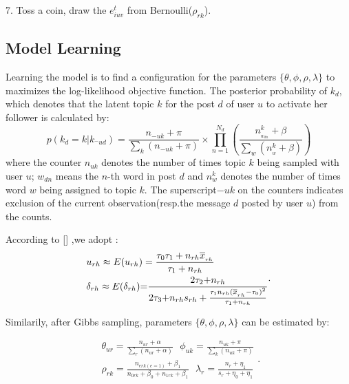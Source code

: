 \documentclass[runningheads,a4paper]{llncs}
\begin{document}
7. Toss a coin, draw the $e_{iuv}^t$ from Bernoulli(${\rho _{rk}}$).

\subsection{Model Learning}
Learning the model is to find a configuration for the parameters $\{ \theta ,\phi ,\rho ,\lambda \}$ to maximizes the log-likelihood objective function.
The posterior probability of ${k_{d}}$, which denotes that the latent topic $k$ for the post $d$ of user $u$ to activate her follower is calculated by:
\begin{equation}\label{14}
  p(k_d=k|{k_{{}^ - ud}}) = \frac{{{n_{ - uk}} + \pi }}{{\sum\limits_k {({n_{ - uk}} + \pi )} }} \times \prod\limits_{n = 1}^{{N_d}} {(\frac{{n_{_{{w_{dn}}}}^k + \beta }}{{\sum\limits_w {(n_{_w}^k + \beta )} }})}
\end{equation}
where the counter $n_{uk}$ denotes the number of times topic $k$ being sampled with user $u$; $w_{dn}$ means the $n$-th word in post $d$ and $n_w^k$ denotes the number of times word $w$ being assigned to topic $k$. The superscript$- uk$ on the counters indicates exclusion of the current observation(resp.the message $d$ posted by user $u$) from the counts.

According to [\cite{bernardo2009bayesian}] ,we adopt :
\begin{equation}\label{10}
\begin{split}
&{u_{rh}} \approx E({u_{rh}}) = \frac{{{\tau _0}{\tau _1} + {n_{rh}}{{\overline x }_{_{rh}}}}}{{{\tau _1} + {n_{rh}}}}\\
& {\delta _{rh}} \approx E({\delta _{rh}}){\rm{ = }}\frac{{{\rm{2}}{\tau _2}{\rm{ + }}{n_{rh}}}}{{{\rm{2}}{\tau _3}{\rm{ + }}{n_{rh}}{s_{rh}} + \frac{{{\tau _1}{n_{rh}}{{({{\overline x }_{_{{r_{}}h}}} - {\tau _0})}^2}}}{{{\tau _1} + {n_{rh}}}}}}
\end{split}
.\end{equation}


Similarily, after Gibbs sampling, parameters $\{ \theta ,\phi ,\rho ,\lambda \}$ can be estimated by:

\begin{equation}\label{12}
\begin{split}
{\theta _{ur}}  = \frac{{{n_{ur}} + \alpha }}{{\sum\limits_r {({n_{ur}} + \alpha )} }}
~~~{\phi _{uk}}  = \frac{{{n_{uk}} + \pi }}{{\sum\limits_k {({n_{uk}} + \pi )} }}\\
{\rho _{rk}}= \frac{{{n_{erk(e = 1)}} + {\beta _1}}}{{{n_{0rk}} + {\beta _0} + {n_{1rk}} + {\beta _1}}}
~~~{\lambda _r}  = \frac{{{n_r} + {\eta _1}}}{{{s_r} + {\eta _0} + {\eta _1}}}
\end{split}
.\end{equation}
\end{document}
